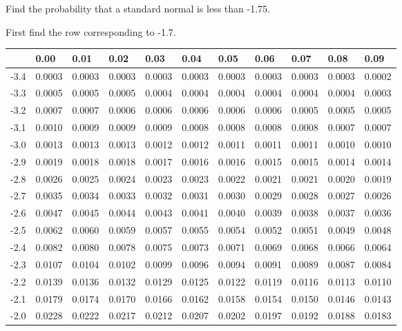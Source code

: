 \begin{frame}{\small Find the probability that a standard normal is less than -1.75.}
  
{\small First find the row corresponding to -1.7.}

  {
\fontsize{5pt}{5pt}
\selectfont

\begin{tabular}{l|llllllllll}
     & 0.00   & 0.01   & 0.02   & 0.03   &  0.04   & 0.05   & 0.06   & 0.07   & 0.08  & 0.09 \\ \hline
-3.4 & 0.0003 & 0.0003 & 0.0003 & 0.0003 & 0.0003 & 0.0003 & 0.0003 & 0.0003 & 0.0003 & 0.0002 \\ 
-3.3 & 0.0005 & 0.0005 & 0.0005 & 0.0004 & 0.0004 & 0.0004 & 0.0004 & 0.0004 & 0.0004 & 0.0003 \\ 
-3.2 & 0.0007 & 0.0007 & 0.0006 & 0.0006 & 0.0006 & 0.0006 & 0.0006 & 0.0005 & 0.0005 & 0.0005 \\ 
-3.1 & 0.0010 & 0.0009 & 0.0009 & 0.0009 & 0.0008 & 0.0008 & 0.0008 & 0.0008 & 0.0007 & 0.0007 \\ 
-3.0 & 0.0013 & 0.0013 & 0.0013 & 0.0012 & 0.0012 & 0.0011 & 0.0011 & 0.0011 & 0.0010 & 0.0010 \\ 
-2.9 & 0.0019 & 0.0018 & 0.0018 & 0.0017 & 0.0016 & 0.0016 & 0.0015 & 0.0015 & 0.0014 & 0.0014 \\ 
-2.8 & 0.0026 & 0.0025 & 0.0024 & 0.0023 & 0.0023 & 0.0022 & 0.0021 & 0.0021 & 0.0020 & 0.0019 \\ 
-2.7 & 0.0035 & 0.0034 & 0.0033 & 0.0032 & 0.0031 & 0.0030 & 0.0029 & 0.0028 & 0.0027 & 0.0026 \\ 
-2.6 & 0.0047 & 0.0045 & 0.0044 & 0.0043 & 0.0041 & 0.0040 & 0.0039 & 0.0038 & 0.0037 & 0.0036 \\ 
-2.5 & 0.0062 & 0.0060 & 0.0059 & 0.0057 & 0.0055 & 0.0054 & 0.0052 & 0.0051 & 0.0049 & 0.0048 \\ 
-2.4 & 0.0082 & 0.0080 & 0.0078 & 0.0075 & 0.0073 & 0.0071 & 0.0069 & 0.0068 & 0.0066 & 0.0064 \\ 
-2.3 & 0.0107 & 0.0104 & 0.0102 & 0.0099 & 0.0096 & 0.0094 & 0.0091 & 0.0089 & 0.0087 & 0.0084 \\ 
-2.2 & 0.0139 & 0.0136 & 0.0132 & 0.0129 & 0.0125 & 0.0122 & 0.0119 & 0.0116 & 0.0113 & 0.0110 \\ 
-2.1 & 0.0179 & 0.0174 & 0.0170 & 0.0166 & 0.0162 & 0.0158 & 0.0154 & 0.0150 & 0.0146 & 0.0143 \\ 
-2.0 & 0.0228 & 0.0222 & 0.0217 & 0.0212 & 0.0207 & 0.0202 & 0.0197 & 0.0192 & 0.0188 & 0.0183 \\ 

\end{tabular}}
\end{frame}

